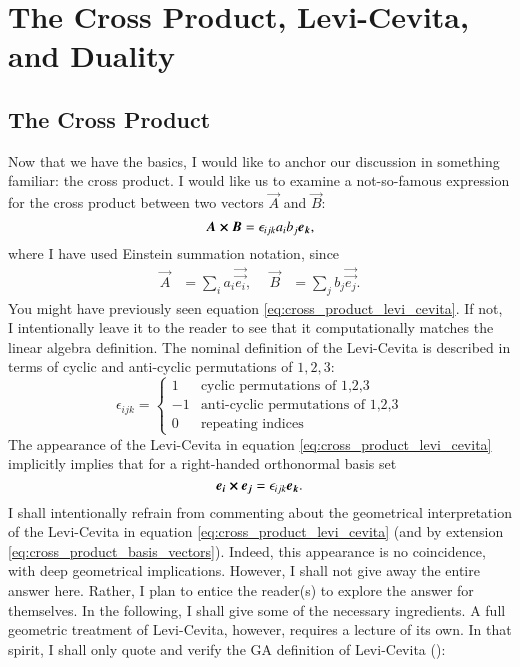 
\section{The Cross Product, Levi-Cevita, and Duality}
\subsection{The Cross Product}

Now that we have the basics, I would like to anchor our discussion in something familiar: the cross product. I would like us to examine a not-so-famous expression for the cross product between two vectors $ \vec{A} $ and $\vec{B} $:
\begin{equation} \label{eq:cross_product_levi_cevita}
    \boldsymbol{A} \cross \boldsymbol{B} = \epsilon_{ijk} a_i b_j \boldsymbol{e_k},
\end{equation}
where I have used Einstein summation notation, since 
\begin{align*}
    \vec{A} &= \sum_i a_i \vec{ \vec{e_i} }, \ &\ \vec{B} &= \sum_j b_j\vec{ \vec{e_j} }.
\end{align*}
You might have previously seen equation \ref{eq:cross_product_levi_cevita}. If not, I intentionally leave it to the reader to see that it computationally matches the linear algebra definition. The nominal definition of the Levi-Cevita is described in terms of cyclic and anti-cyclic permutations of $1, 2, 3$:
\begin{equation}
    \label{eq:levicivita_nominal_def}
    \epsilon_{ijk} = 
    \begin{cases} 
          1 & \text{cyclic permutations of 1,2,3} \\
          -1 & \text{anti-cyclic permutations of 1,2,3} \\
          0 & \text{repeating indices}
       \end{cases}
\end{equation}
The appearance of the Levi-Cevita in equation \ref{eq:cross_product_levi_cevita} implicitly implies that for a right-handed orthonormal basis set
\begin{equation}
    \label{eq:cross_product_basis_vectors}
     \boldsymbol{\boldsymbol{e_i}} \cross \boldsymbol{\boldsymbol{e_j}} = \epsilon_{ijk} \boldsymbol{\boldsymbol{e_k}} .
\end{equation}
I shall intentionally refrain from commenting about the geometrical interpretation of the Levi-Cevita in equation \ref{eq:cross_product_levi_cevita} (and by extension \ref{eq:cross_product_basis_vectors}). Indeed, this appearance is no coincidence, with deep geometrical implications. However, I shall not give away the entire answer here. Rather, I plan to entice the reader(s) to explore the answer for themselves. In the following, I shall give some of the necessary ingredients. A full geometric treatment of Levi-Cevita, however, requires a lecture of its own. In that spirit, I shall only quote and verify the GA definition of Levi-Cevita (\cite{doran_geometric_2003}):
